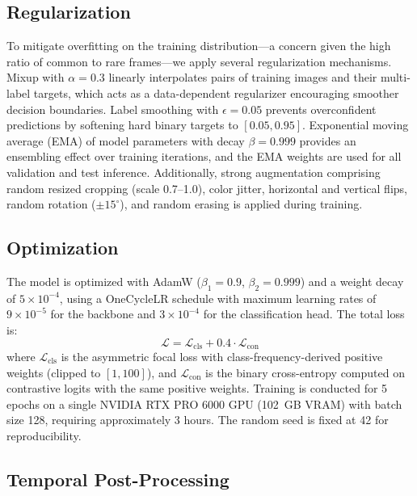 \documentclass[12pt]{article}
\begin{document}
\subsection{Regularization}

To mitigate overfitting on the training distribution—a concern given the high ratio of common to rare frames—we apply several regularization mechanisms. Mixup \cite{Zhang2018mixup} with $\alpha = 0.3$ linearly interpolates pairs of training images and their multi-label targets, which acts as a data-dependent regularizer encouraging smoother decision boundaries. Label smoothing \cite{Szegedy2016labelsmoothing} with $\epsilon = 0.05$ prevents overconfident predictions by softening hard binary targets to $[0.05, 0.95]$. Exponential moving average (EMA) of model parameters with decay $\beta = 0.999$ provides an ensembling effect over training iterations, and the EMA weights are used for all validation and test inference. Additionally, strong augmentation comprising random resized cropping (scale 0.7--1.0), color jitter, horizontal and vertical flips, random rotation ($\pm 15^{\circ}$), and random erasing is applied during training.

\subsection{Optimization}

The model is optimized with AdamW ($\beta_1=0.9$, $\beta_2=0.999$) and a weight decay of $5\times10^{-4}$, using a OneCycleLR schedule with maximum learning rates of $9\times10^{-5}$ for the backbone and $3\times10^{-4}$ for the classification head. The total loss is:
\begin{equation}
    \mathcal{L} = \mathcal{L}_{\text{cls}} + 0.4 \cdot \mathcal{L}_{\text{con}}
\end{equation}
where $\mathcal{L}_{\text{cls}}$ is the asymmetric focal loss with class-frequency-derived positive weights (clipped to $[1, 100]$), and $\mathcal{L}_{\text{con}}$ is the binary cross-entropy computed on contrastive logits with the same positive weights. Training is conducted for 5 epochs on a single NVIDIA RTX PRO 6000 GPU (102~GB VRAM) with batch size 128, requiring approximately 3 hours. The random seed is fixed at 42 for reproducibility.

\subsection{Temporal Post-Processing}
\end{document}
